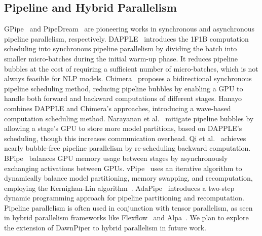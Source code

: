 \subsection{Pipeline and Hybrid Parallelism}
GPipe~\cite{huangGpipeEfficientTraining2019} and PipeDream~\cite{narayananPipeDreamGeneralizedPipeline2019}
are pioneering works in synchronous and asynchronous pipeline parallelism, respectively.
DAPPLE~\cite{fanDAPPLEPipelinedData2021} introduces the 1F1B computation scheduling into synchronous pipeline parallelism
by dividing the batch into smaller micro-batches during the initial warm-up phase.
It reduces pipeline bubbles at the cost of requiring a sufficient number of micro-batches,
which is not always feasible for NLP models.
Chimera~\cite{liChimeraEfficientlyTraining2021} proposes a bidirectional synchronous pipeline scheduling method,
reducing pipeline bubbles by enabling a GPU to handle both forward and backward computations of different stages.
Hanayo~\cite{liuHanayoHarnessingWavelike2023} combines DAPPLE and Chimera’s approaches,
introducing a wave-based computation scheduling method.
Narayanan et al.~\cite{narayananEfficientLargeScaleLanguage2021} mitigate pipeline bubbles by
allowing a stage’s GPU to store more model partitions, based on DAPPLE’s scheduling,
though this increases communication overhead.
Qi et al.~\cite{qiZeroBubbleAlmost} achieves nearly bubble-free
pipeline parallelism by re-scheduling backward computation.
BPipe~\cite{kimBPipeMemoryBalancedPipeline2023} balances GPU memory usage
between stages by asynchronously exchanging activations between GPUs.
vPipe~\cite{zhaoVPipeVirtualizedAcceleration2022} uses an iterative algorithm to
dynamically balance model partitioning, memory swapping, and recomputation, employing the Kernighan-Lin algorithm~\cite{kernighanEfficientHeuristicProcedure1970}.
AdaPipe~\cite{sunAdaPipeOptimizingPipeline2024} introduces a two-step
dynamic programming approach for pipeline partitioning and recomputation.
Pipeline parallelism is often used in conjunction with tensor parallelism,
as seen in hybrid parallelism frameworks like Flexflow~\cite{jiaDataModelParallelism2019} and Alpa~\cite{zhengAlpaAutomatingInter2022}.
We plan to explore the extension of DawnPiper to hybrid parallelism in future work.